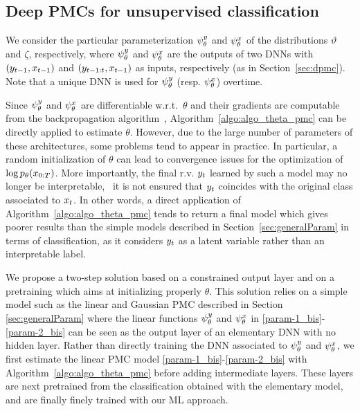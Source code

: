 

\subsection{Deep PMCs for unsupervised classification}
\label{sec:deeppmc}
We consider the particular parameterization $\psi^{y}_{\theta}$ and $\psi^{x}_{\theta}$ of the
distributions $\vartheta$ and $\zeta$, respectively, where $\psi^{y}_{\theta}$ and $\psi^{x}_{\theta}$
are the outputs of two DNNs with $(y_{t-1},x_{t-1})$ and $(y_{t-1:t},
x_{t-1})$ as inputs, respectively (as in Section~\ref{sec:dpmc}).
Note that a unique DNN is used for $\psi^{y}_{\theta}$ (resp. $\psi^{x}_{\theta}$) overtime.

Since $\psi^{y}_{\theta}$ and $\psi^{x}_{\theta}$ are differentiable w.r.t.~$\theta$ and their gradients
are computable from the backpropagation algorithm~\citep{rumelhart1986learning},
Algorithm~\ref{algo:algo_theta_pmc} can be directly applied to estimate $\theta$.
However, due to the large number of parameters of these architectures, some
problems tend to appear in practice. In particular, a random initialization of
$\theta$ can lead to convergence issues for the optimization of $\log p_{\theta}(x_{0:
T})$. More importantly, the final r.v. $y_t$ learned by such a model may no
longer be interpretable, \ie~it is not ensured that $y_t$ coincides with the
original class associated to $x_t$. In other words, a direct application of
Algorithm~\ref{algo:algo_theta_pmc} tends to return a final model which gives
poorer results than the simple models described in Section~\ref{sec:generalParam} 
in terms of classification, as it considers $y_t$ as a latent variable rather
than an interpretable label.


We propose a two-step solution based on a constrained output layer and on a
pretraining which aims at initializing properly $\theta$. This solution relies
on a simple model such as the linear and Gaussian PMC described in Section
\ref{sec:generalParam} where the linear functions $\psi^{y}_{\theta}$ and $\psi^{x}_{\theta}$ in
\eqref{param-1_bis}-\eqref{param-2_bis} can be seen as the output layer of an
elementary DNN with no hidden layer. Rather than directly training the DNN
associated to $\psi^{y}_{\theta}$ and $\psi^{x}_{\theta}$, we first estimate the linear PMC model
\eqref{param-1_bis}-\eqref{param-2_bis} with Algorithm~\ref{algo:algo_theta_pmc}
before adding intermediate layers. %
These layers are
next pretrained from the classification obtained with the elementary model, and
are finally finely trained with our ML approach.


